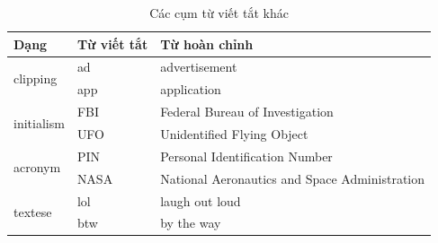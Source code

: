 \begin{table}[htb]
    \centering
    \caption{Các cụm từ viết tắt khác}
    \begin{tabular}{lll}
        \toprule
        \textbf{Dạng}               & \textbf{Từ viết tắt} & \textbf{Từ hoàn chỉnh}                        \\\midrule
        \multirow{2}{*}{clipping}   & ad                   & advertisement                                 \\
                                    & app                  & application                                   \\\midrule
        \multirow{2}{*}{initialism} & FBI                  & Federal Bureau of Investigation               \\
                                    & UFO                  & Unidentified Flying Object                    \\\midrule
        \multirow{2}{*}{acronym}    & PIN                  & Personal Identification Number                \\
                                    & NASA                 & National Aeronautics and Space Administration \\\midrule
        \multirow{2}{*}{textese}    & lol                  & laugh out loud                                \\
                                    & btw                  & by the way                                    \\
        \bottomrule
    \end{tabular}
\end{table}
\clearpage

